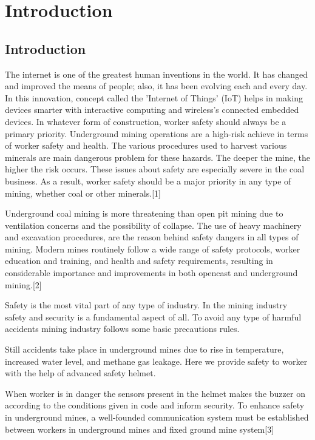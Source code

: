 \documentclass[12pt,a4paper]{report}
\begin{document}
\noindent 
\newpage

\chapter{Introduction}
\hspace{6pt}
\section{Introduction}

\noindent The internet is one of the greatest human inventions in the world. It has   changed and improved the means of people; also, it has been  evolving each  and every day. In this innovation, concept called the 'Internet of Things' (IoT) helps in making devices smarter with interactive computing and wireless's connected embedded devices. In whatever form of construction, worker safety should always be a primary priority. Underground mining operations are a high-risk achieve in terms of worker safety and health. The various procedures used to  harvest various minerals are main dangerous problem for these hazards. The deeper the mine, the higher the risk occurs. These issues about safety are especially severe in the coal business. As a result, worker safety should be a major priority in any type of mining, whether coal or other minerals.[1] 

\noindent Underground coal mining is more threatening than open pit mining due to ventilation concerns and the possibility of collapse. The use of heavy machinery and excavation procedures, are the reason behind safety dangers in all types of mining. Modern mines routinely follow a wide range of safety protocols, worker education and training, and health and safety requirements, resulting in considerable importance and improvements in both opencast and underground mining.[2]

\noindent Safety is the most vital part of any type of industry. In the mining industry safety and security is a fundamental aspect of all. To avoid any type of harmful accidents mining industry follows some basic precautions rules. 

\noindent Still accidents take place in underground mines due to rise in temperature, increased water level, and methane gas leakage. Here we provide safety to worker with the help of advanced safety helmet.

\noindent When worker is in danger the sensors present in the helmet makes the buzzer on  according to the conditions given in code and inform security. To enhance safety in underground mines, a well-founded communication system must be established between workers in underground mines and fixed ground mine system[3]
\end{document}
